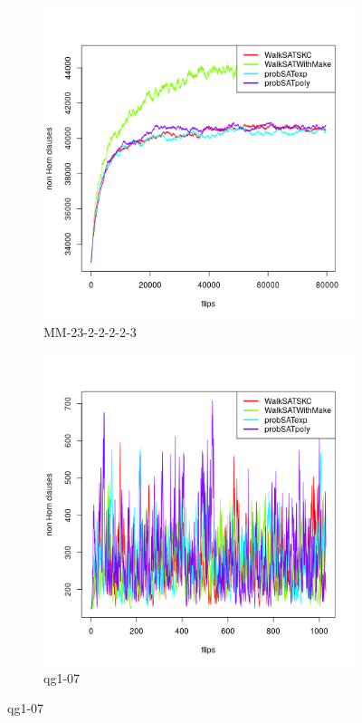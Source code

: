 \documentclass[12pt,a4paper]{article}
\begin{document}
\begin{figure}[H]
  \begin{subfigure}{0.45\textwidth}
    \includegraphics[width=\textwidth]{trends/MM-23-2-2-2-2-3[SKIP=0].png}
    \caption{MM-23-2-2-2-2-3}
  \end{subfigure}
  \begin{subfigure}{0.45\textwidth}
    \includegraphics[width=\textwidth]{trends/qg1-07[SKIP=0].png}
    \caption{qg1-07}
  \end{subfigure}
\end{figure}
\end{document}
